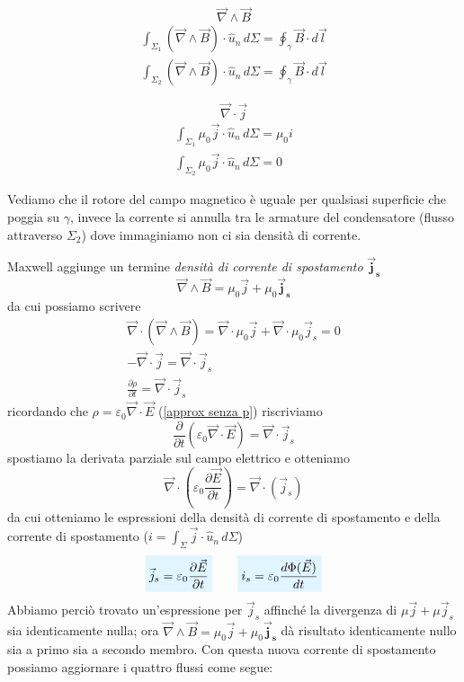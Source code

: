 \documentclass[x11names]{report}
\begin{document}
\begin{minipage}{0.5\textwidth}
	\[
	\boxed{\vec{\nabla}\wedge \vec{B}}
	\]
	\begin{gather*}
		\int_{\Sigma_1}\left(\vec{\nabla}\wedge \vec{B}\right)\cdot \hat{u}_n \, d\Sigma = \oint_\gamma \vec{B} \cdot d\vec{l} \\
		\int_{\Sigma_2}\left(\vec{\nabla}\wedge \vec{B}\right)\cdot \hat{u}_n \, d\Sigma = \oint_\gamma \vec{B} \cdot d\vec{l}
	\end{gather*}
\end{minipage}
\begin{minipage}{0.5\textwidth}
	\[
	\boxed{\vec{\nabla}\cdot \vec{j}}
	\]
	\begin{gather*}
		\int_{\Sigma_1} \mu_0 \vec{j} \cdot \hat{u}_n \, d\Sigma = \mu_0 i \\
		\int_{\Sigma_2} \mu_0 \vec{j} \cdot \hat{u}_n \, d\Sigma = 0
	\end{gather*}
\end{minipage}\vspace{0.8cm}
Vediamo che il rotore del campo magnetico è uguale per qualsiasi superficie che poggia su \(\gamma\), invece la corrente si annulla tra le armature del condensatore (flusso attraverso \(\Sigma_2\)) dove immaginiamo non ci sia densità di corrente. 

Maxwell aggiunge un termine \textit{densità di corrente di spostamento} \(\boldsymbol{\vec{j}_s}\)
\[
\vec{\nabla}\wedge \vec{B} = \mu_0 \vec{j} + \mu_0 \boldsymbol{\vec{j}_s}
\]
da cui possiamo scrivere
\begin{gather*}
	\vec{\nabla}\cdot\left(\vec{\nabla}\wedge \vec{B}\right) = \vec{\nabla}\cdot\mu_0 \vec{j} + \vec{\nabla}\cdot\mu_0 \vec{j}_s = 0 \\
	-\vec{\nabla}\cdot\vec{j} = \vec{\nabla}\cdot\vec{j}_s \\
	\frac{\partial \rho}{\partial t} = \vec{\nabla}\cdot\vec{j}_s
\end{gather*}
ricordando che \(\rho = \varepsilon_0\vec{\nabla}\cdot\vec{E}\) (\ref{approx senza p}) riscriviamo
\[
\frac{\partial}{\partial t}\left(\varepsilon_0\vec{\nabla}\cdot\vec{E}\right)=\vec{\nabla}\cdot\vec{j}_s
\]
spostiamo la derivata parziale sul campo elettrico e otteniamo
\[
\vec{\nabla}\cdot\left(\varepsilon_0\frac{\partial\vec{E}}{\partial t}\right) = \vec{\nabla}\cdot\left(\vec{j}_s\right) 
\]
da cui otteniamo le espressioni della densità di corrente di spostamento e della corrente di spostamento (\(i = \int_\Sigma \vec{j}\cdot\hat{u}_n \, d\Sigma\))
\begin{equation}
	\viola{\vec{j}_s = \varepsilon_0\frac{\partial\vec{E}}{\partial t}} \qquad \viola{i_s = \varepsilon_0\frac{d\Phi(\vec{E})}{dt}}
\end{equation}
Abbiamo perciò trovato un'espressione per \(\vec{j}_s\) affinché la divergenza di \(\mu\vec{j}+\mu\vec{j}_s\) sia identicamente nulla; ora \(\vec{\nabla}\wedge \vec{B} = \mu_0 \vec{j} + \mu_0 \boldsymbol{\vec{j}_s}\) dà risultato identicamente nullo sia a primo sia a secondo membro.
Con questa nuova corrente di spostamento possiamo aggiornare i quattro flussi come segue:
\end{document}
